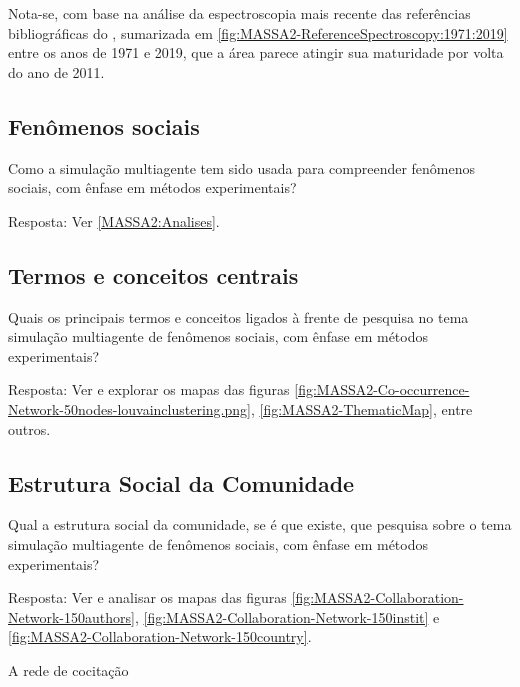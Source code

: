 Nota-se, com base na análise da espectroscopia mais recente das referências bibliográficas do \dataset, sumarizada em \ref{fig:MASSA2-ReferenceSpectroscopy:1971:2019} entre os anos de 1971 e 2019, que a área parece atingir sua maturidade por volta do ano de 2011.

\subsection{Fenômenos sociais}
   
Como a simulação multiagente tem sido usada para compreender fenômenos sociais, com ênfase em métodos experimentais? 

Resposta: Ver \ref{MASSA2:Analises}.

\subsection{Termos e conceitos centrais}

Quais os principais termos e conceitos ligados à frente de pesquisa no tema simulação multiagente de fenômenos sociais, com ênfase em métodos experimentais? 

Resposta: Ver e explorar os mapas das figuras \ref{fig:MASSA2-Co-occurrence-Network-50nodes-louvainclustering.png}, \ref{fig:MASSA2-ThematicMap}, entre outros.

\subsection{Estrutura Social da Comunidade}

Qual a estrutura social da comunidade, se é que existe, que pesquisa sobre o tema simulação multiagente de fenômenos sociais, com ênfase em métodos experimentais?

Resposta: Ver e analisar os mapas das figuras \ref{fig:MASSA2-Collaboration-Network-150authors}, \ref{fig:MASSA2-Collaboration-Network-150instit} e \ref{fig:MASSA2-Collaboration-Network-150country}.

A rede de cocitação 